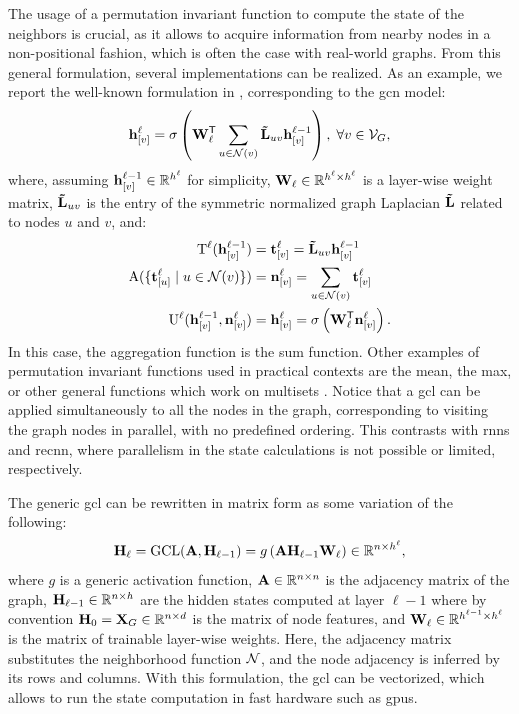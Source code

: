 The usage of a permutation invariant function to compute the state of the neighbors is crucial, as it allows to acquire information from nearby nodes in a non-positional fashion, which is often the case with real-world graphs. From this general formulation, several implementations can be realized. As an example, we report the well-known formulation in \citep{kipf2017semisupervisedgcn}, corresponding to the \gls{gcn} model:
\begin{align}
    \label{eq:convolutional}
    \Elem{h}{v}^{\ell} = \sigma\Paren{\Matrix{W}^{\Transpose}_{\ell} \sum_{u \in \Cal{N}(v)} \Matrix{\tilde{L}}_{uv}\Elem{h}{v}^{\ell-1}}, \; \forall v \in \Cal{V}_G,
\end{align}
where, assuming $\Elem{h}{v}^{\ell-1} \in \Real^{h^{\ell}}$ for simplicity, $\Matrix{W}_{\ell} \in \Real^{h^{\ell} \times h^{\ell}}$ is a layer-wise weight matrix, $\Matrix{\tilde{L}}_{uv}$ is the entry of the symmetric normalized graph Laplacian $\Matrix{\tilde{L}}$ related to nodes $u$ and $v$, and:
\begin{align}
    \label{eq:transform}
    \Fun{T}^{\ell}(\Elem{h}{v}^{\ell-1}) &= \Elem{t}{v}^{\ell}  = \Matrix{\tilde{L}}_{uv}\Elem{h}{v}^{\ell-1}\\
    \label{eq:aggregate}
    \Fun{A}(\Set{\Elem{t}{u}^{\ell} \mid u \in \Cal{n}(v)}) &= \Elem{n}{v}^{\ell} = \sum_{u \in \Cal{n}(v)}\Elem{t}{v}^{\ell}\\
    \label{eq:update}
    \Fun{U}^{\ell}(\Elem{h}{v}^{\ell-1}, \Elem{n}{v}^{\ell}) &= \Elem{h}{v}^{\ell} =  \sigma\Paren{\Matrix{W}^{\Transpose}_{\ell} \Elem{n}{v}^{\ell}}.
\end{align}
In this case, the aggregation function is the sum function. Other examples of permutation invariant functions used in practical contexts are the mean, the max, or other general functions which work on multisets \citep{zaheer2017deepsets}. Notice that a \gls{gcl} can be applied simultaneously to all the nodes in the graph, corresponding to visiting the graph nodes in parallel, with no predefined ordering. This contrasts with \glspl{rnn} and \gls{recnn}, where parallelism in the state calculations is not possible or limited, respectively.

The generic \gls{gcl} can be rewritten in matrix form as some variation of the following:
$$\Matrix{H}_{\ell} = \Fun{GCL}(\Matrix{A}, \Matrix{H}_{\ell-1}) = g\Paren{\Matrix{A}\Matrix{H}_{\ell-1}\Matrix{W}_{\ell}} \in \Real^{n \times h^{\ell}},$$
where $g$ is a generic activation function, $\Matrix{A} \in \Real^{n \times n}$ is the adjacency matrix of the graph, $\Matrix{H}_{\ell-1} \in \Real^{n \times h}$ are the hidden states computed at layer $\ell-1$ where by convention $\Matrix{H}_0 = \Matrix{X}_G \in \Real^{n \times d}$ is the matrix of node features, and $\Matrix{W}_{\ell} \in \Real^{h^{\ell-1} \times h^{\ell}}$ is the matrix of trainable layer-wise weights. Here, the adjacency matrix substitutes the neighborhood function $\Cal{N}$, and the node adjacency is inferred by its rows and columns. With this formulation, the \gls{gcl} can be vectorized, which allows to run the state computation in fast hardware such as \glspl{gpu}.

